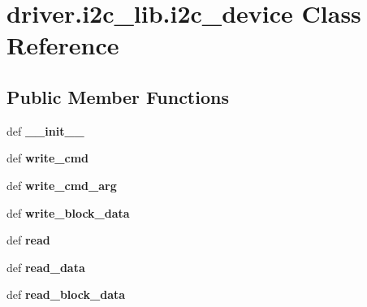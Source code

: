 \hypertarget{classdriver_1_1i2c__lib_1_1i2c__device}{}\section{driver.\+i2c\+\_\+lib.\+i2c\+\_\+device Class Reference}
\label{classdriver_1_1i2c__lib_1_1i2c__device}
\subsection*{Public Member Functions}
\begin{DoxyCompactItemize}
\item 
\hypertarget{classdriver_1_1i2c__lib_1_1i2c__device_a6f4de0589e9fc9d80dfcbe78764adca6}{}def {\bfseries \+\_\+\+\_\+init\+\_\+\+\_\+}\label{classdriver_1_1i2c__lib_1_1i2c__device_a6f4de0589e9fc9d80dfcbe78764adca6}

\item 
\hypertarget{classdriver_1_1i2c__lib_1_1i2c__device_a4793439f363c2b22a7f3beae6074f755}{}def {\bfseries write\+\_\+cmd}\label{classdriver_1_1i2c__lib_1_1i2c__device_a4793439f363c2b22a7f3beae6074f755}

\item 
\hypertarget{classdriver_1_1i2c__lib_1_1i2c__device_ae998e6b6651a038c5b5466ae941e0eb8}{}def {\bfseries write\+\_\+cmd\+\_\+arg}\label{classdriver_1_1i2c__lib_1_1i2c__device_ae998e6b6651a038c5b5466ae941e0eb8}

\item 
\hypertarget{classdriver_1_1i2c__lib_1_1i2c__device_ae270018219f2f96ec9e37e36065d2edc}{}def {\bfseries write\+\_\+block\+\_\+data}\label{classdriver_1_1i2c__lib_1_1i2c__device_ae270018219f2f96ec9e37e36065d2edc}

\item 
\hypertarget{classdriver_1_1i2c__lib_1_1i2c__device_a9a8d9b4cc3d3890baa0738c9fa60ef4b}{}def {\bfseries read}\label{classdriver_1_1i2c__lib_1_1i2c__device_a9a8d9b4cc3d3890baa0738c9fa60ef4b}

\item 
\hypertarget{classdriver_1_1i2c__lib_1_1i2c__device_a7960797223c6a315d764f8b1ff11a8f2}{}def {\bfseries read\+\_\+data}\label{classdriver_1_1i2c__lib_1_1i2c__device_a7960797223c6a315d764f8b1ff11a8f2}

\item 
\hypertarget{classdriver_1_1i2c__lib_1_1i2c__device_ad837253a1137bd4ae725f80640ace947}{}def {\bfseries read\+\_\+block\+\_\+data}\label{classdriver_1_1i2c__lib_1_1i2c__device_ad837253a1137bd4ae725f80640ace947}

\end{DoxyCompactItemize}
